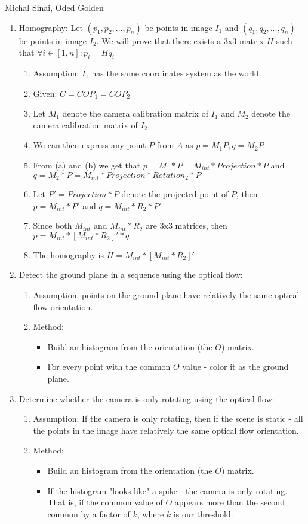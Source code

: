 \documentclass{article}
\begin{document}
\newline  Michal Sinai, Oded Golden
\begin{enumerate}
\item Homography: Let $(p_1,p_2,...,p_n)$ be points in image $I_1$ and $(q_1,q_2,...,q_n)$ be points in image $I_2$. We will prove that there exists a 3x3 matrix $H$ such that $\forall i\in [1,n]: p_i=Hq_i$
\begin{enumerate}
\item Assumption: $I_1$ has the same coordinates system as the world.
\item Given: $C=COP_1=COP_2$
\item Let $M_1$ denote the camera calibration matrix of $I_1$ and $M_2$ denote the camera calibration matrix of $I_2$.
\item We can then express any point $P$ from $A$ as $p=M_1P, q=M_2P$
\item From (a) and (b) we get that $p=M_1*P=M_{int}*Projection*P$ and $q=M_2*P=M_{int}*Projection*Rotation_2*P$
\item Let $P'=Projection*P$ denote the projected point of $P$, then $p=M_{int}*P'$ and $q=M_{int}*R_2*P'$
\item Since both $M_{int}$ and $M_{int}*R_2$ are 3x3 matrices, then $p=M_{int}*[M_{int}*R_2]'*q$
\item The homography is $H=M_{int}*[M_{int}*R_2]'$
\end{enumerate}
\item Detect the ground plane in a sequence using the optical flow:
\begin{enumerate}
\item Assumption: points on the ground plane have relatively the same optical flow orientation.
\item Method:
\begin{itemize}
\item Build an histogram from the orientation (the $O$) matrix.
\item For every point with the common $O$ value - color it as the ground plane.
\end{itemize}

\end{enumerate}

\item Determine whether the camera is only rotating using the optical flow:
\begin{enumerate}
\item Assumption: If the camera is only rotating, then if the scene is static - all the points in the image have relatively the same optical flow orientation.
\item Method:
\begin{itemize}
\item Build an histogram from the orientation (the $O$) matrix.
\item If the histogram "looks like" a spike - the camera is only rotating. That is, if the common value of $O$ appears more than the second common by a factor of $k$, where $k$ is our threshold.
\end{itemize}

\end{enumerate}

\end{enumerate}
\end{document}
